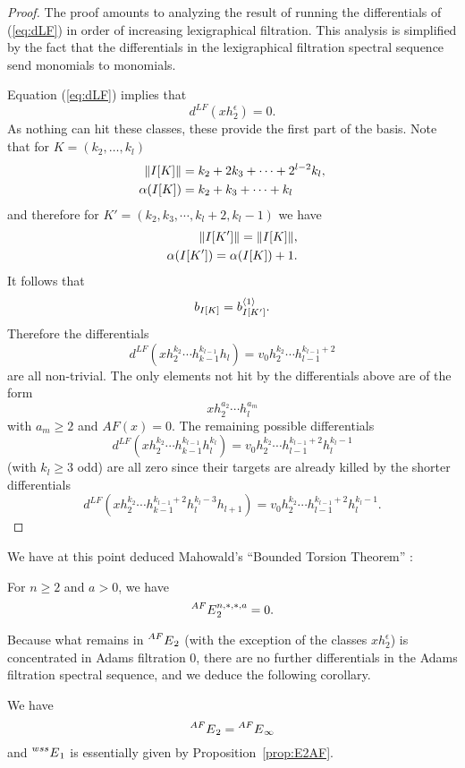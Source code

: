 \begin{proof}
The proof amounts to analyzing the result of running the differentials of (\ref{eq:dLF}) in order of increasing lexigraphical filtration.  This analysis is simplified by the fact that the differentials in the lexigraphical filtration spectral sequence send monomials to monomials.

Equation (\ref{eq:dLF}) implies that 
$$ d^{LF}(x h_2^\epsilon )= 0. $$
As nothing can hit these classes, these provide the first part of the basis.  Note that for $K = (k_2, \ldots, k_l)$
\begin{align*}
\lVert I[K] \rVert & = k_2+2k_3+ \cdots + 2^{l-2}k_l, \\
\alpha(I[K]) & = k_2 + k_3 + \cdots + k_l
\end{align*}
and therefore for $K' = (k_2, k_3, \cdots, k_l+2, k_l-1)$ we have
\begin{align*}
\lVert I[K'] \rVert = \lVert I[K] \rVert,  \\
\alpha(I[K']) = \alpha(I[K])+1.
\end{align*}
It follows that
$$ b_{I[K]} = b^{\langle 1 \rangle}_{I[K']}. $$
Therefore the differentials
$$ d^{LF}(xh_2^{k_2} \cdots h_{k-1}^{k_{l-1}}h_l) = v_0 h_2^{k_2} \cdots h_{l-1}^{k_{l-1}+2} $$
are all non-trivial.  The only elements not hit by the differentials above are of the form
$$ x h_2^{a_2} \cdots h_l^{a_m} $$
with $a_m \ge 2$ and $AF(x) = 0$.  The remaining possible differentials
$$ d^{LF}(xh_2^{k_2} \cdots h_{k-1}^{k_{l-1}}h_l^{k_l}) = v_0 h_2^{k_2} \cdots h_{l-1}^{k_{l-1}+2}h_{l}^{k_l-1} $$
(with $k_l \ge 3$ odd) are all zero since their targets are already killed by the shorter differentials
$$ d^{LF}(xh_2^{k_2} \cdots h_{k-1}^{k_{l-1}+2}h_l^{k_l-3}h_{l+1}) = v_0 h_2^{k_2} \cdots h_{l-1}^{k_{l-1}+2}h_{l}^{k_l-1}. $$
\end{proof}

We have at this point deduced Mahowald's ``Bounded Torsion Theorem'' \cite{Mahowaldbo}:

\begin{cor}\label{cor:BTT}
For $n \ge 2$ and $a > 0$, we have
$$ \prescript{AF}{}{E}_2^{n,*,*,a} = 0. $$
\end{cor}

Because what remains in $\prescript{AF}{}{E}_2$ (with the exception of the classes $xh_2^\epsilon$) is concentrated in Adams filtration 0, there are no further differentials in the Adams filtration spectral sequence, and we deduce the following corollary.

\begin{cor}\label{cor:E1wss}
We have
$$ \prescript{AF}{}{E}_2 = \prescript{AF}{}{E}_\infty $$
and $\prescript{wss}{}{E}_1$ is essentially given by Proposition~\ref{prop:E2AF}.
\end{cor}

